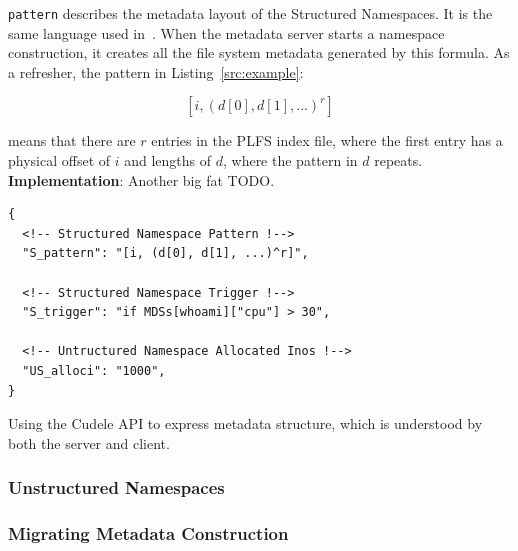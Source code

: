 \texttt{pattern} describes the metadata layout of the Structured Namespaces. It
is the same language used in~\cite{he:hpdc13-plfs-patterns}. When the metadata
server starts a namespace construction, it creates all the file system metadata
generated by this formula. As a refresher, the pattern in Listing~\ref{src:example}:

  \[[i, (d[0], d[1], ...)^r]\]

means that there are \(r\) entries in the PLFS index file, where the first
entry has a physical offset of \(i\) and lengths of \(d\), where the pattern in
\(d\) repeats. \\



\noindent\textbf{Implementation}: Another big fat TODO.

\begin{listing}
\begin{verbatim}
{
  <!-- Structured Namespace Pattern !-->
  "S_pattern": "[i, (d[0], d[1], ...)^r]",
  
  <!-- Structured Namespace Trigger !-->
  "S_trigger": "if MDSs[whoami]["cpu"] > 30",
  
  <!-- Untructured Namespace Allocated Inos !-->
  "US_alloci": "1000",
}
\end{verbatim}
\caption{Using the Cudele API to express metadata structure, which is
understood by both the server and client.}
\label{src:example}
\end{listing}

\subsubsection{Unstructured Namespaces}
\label{sec:unstructured-namespaces}

\subsubsection{Migrating Metadata Construction}
\label{sec:migrating-metadata-construction}

